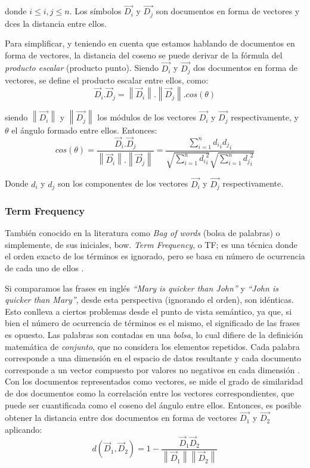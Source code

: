 donde \(i \leq i,j \leq n\). Los símbolos \(\overrightarrow{D_i}\) y \(\overrightarrow{D_j}\) son documentos en forma de vectores y dces la distancia entre ellos.

\bigskip Para simplificar, y teniendo en cuenta que estamos hablando de documentos en forma de vectores, la distancia del coseno se puede derivar de la fórmula del \textit{producto escalar} (producto punto). Siendo \(\overrightarrow{D_i}\) y \(\overrightarrow{D_j}\) dos documentos en forma de vectores, se define el producto escalar entre ellos, como:
\[\vec{D}_i.\vec{D}_j = \left \| \vec{D}_i \right \|.\left \| \vec{D}_j \right \|.cos(\theta)\]

siendo \(\left \|\overrightarrow{D_i}\right \|\) y \(\left \|\overrightarrow{D_j}\right \|\) los módulos de los vectores \(\overrightarrow{D_i}\) y \(\overrightarrow{D_j}\) respectivamente, y $\theta$ el ángulo formado entre ellos. Entonces:
\[cos(\theta) = \frac{\vec{D}_i.\vec{D}_j}{\left \| \vec{D}_i \right \|.\left \| \vec{D}_j \right \|}=\frac{\sum_{i=1}^{n}{{d_i}_i{d_j}_i}}{\sqrt{\sum_{i=1}^{n}{{d_i}_i^{2}}}\sqrt{\sum_{i=1}^{n}{{d_j}_i^{2}}}}\]

Donde \(d_i\) y \(d_j\) son los componentes de los vectores \(\overrightarrow{D_i}\) y \(\overrightarrow{D_j}\) respectivamente.

\subsubsection{Term Frequency}
También conocido en la literatura como \textit{Bag of words} (bolsa de palabras) o simplemente, de sus iniciales, bow. \textit{Term Frequency}, o TF; es una técnica donde el orden exacto de los términos es ignorado, pero se basa en número de ocurrencia de cada uno de ellos \citep{christopher2008introduction}.

\bigskip Si comparamos las frases en inglés \textit{“Mary is quicker than John”} y \textit{“John is quicker than Mary”}, desde esta perspectiva (ignorando el orden), son idénticas. Esto conlleva a ciertos problemas desde el punto de vista semántico, ya que, si bien el número de ocurrencia de términos es el mismo, el significado de las frases es opuesto. Las palabras son contadas en una \textit{bolsa}, lo cual difiere de la definición matemática de \textit{conjunto}, que no considera los elementos repetidos. Cada palabra corresponde a una dimensión en el espacio de datos resultante y cada documento corresponde a un vector compuesto por valores no negativos en cada dimensión \citep{huang2008similarity}. Con los documentos representados como vectores, se mide el grado de similaridad de dos documentos como la correlación entre los vectores correspondientes, que puede ser cuantificada como el coseno del ángulo entre ellos. Entonces, es posible obtener la distancia entre dos documentos en forma de vectores \(\overrightarrow{D_1}\) y \(\overrightarrow{D_2}\) aplicando:
\[d(\vec{D}_1, \vec{D}_2) = 1 - \frac{\vec{D}_1 \vec{D}_2}{\left \| \vec{D}_1 \right\| \left \| \vec{D}_2 \right\|}\]

